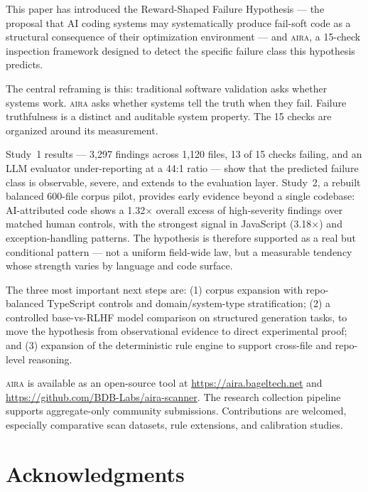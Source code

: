 \documentclass[11pt]{article}
\newcommand{\aira}{\textsc{aira}}
\begin{document}
This paper has introduced the Reward-Shaped Failure Hypothesis --- the proposal that AI coding
systems may systematically produce fail-soft code as a structural consequence of their
optimization environment --- and \aira{}, a 15-check inspection framework designed to detect
the specific failure class this hypothesis predicts.

The central reframing is this: traditional software validation asks whether systems work.
\aira{} asks whether systems tell the truth when they fail. Failure truthfulness is a
distinct and auditable system property. The 15 checks are organized around its measurement.

Study~1 results --- 3,297 findings across 1,120 files, 13 of 15 checks failing, and an LLM
evaluator under-reporting at a 44:1 ratio --- show that the predicted failure class is
observable, severe, and extends to the evaluation layer. Study~2, a rebuilt balanced 600-file
corpus pilot, provides early evidence beyond a single codebase: AI-attributed code shows a
1.32$\times$ overall excess of high-severity findings over matched human controls, with the
strongest signal in JavaScript (3.18$\times$) and exception-handling patterns. The hypothesis
is therefore supported as a real but conditional pattern --- not a uniform field-wide law,
but a measurable tendency whose strength varies by language and code surface.

The three most important next steps are: (1) corpus expansion with repo-balanced TypeScript
controls and domain/system-type stratification; (2) a controlled base-vs-RLHF model
comparison on structured generation tasks, to move the hypothesis from observational evidence
to direct experimental proof; and (3) expansion of the deterministic rule engine to support
cross-file and repo-level reasoning.

\aira{} is available as an open-source tool at \url{https://aira.bageltech.net} and
\url{https://github.com/BDB-Labs/aira-scanner}. The research collection pipeline supports
aggregate-only community submissions. Contributions are welcomed, especially comparative
scan datasets, rule extensions, and calibration studies.

\section*{Acknowledgments}
\end{document}
